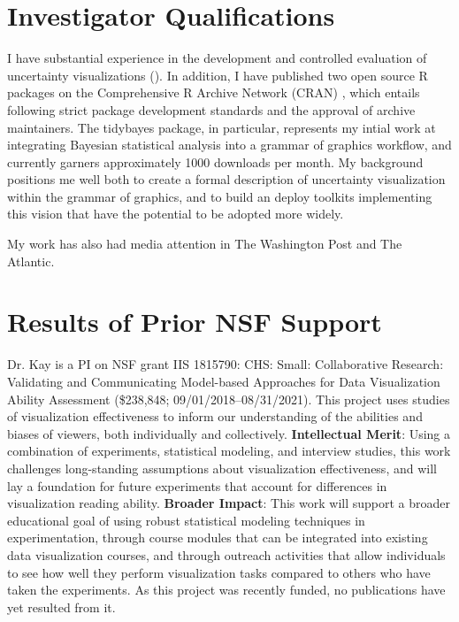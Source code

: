 \documentclass[11pt]{article}
\begin{document}
\section{Investigator Qualifications}
\noindent I have substantial experience in the development and controlled evaluation of uncertainty visualizations (\eg \cite{Fernandes2018, kay2016bus, kale2018hypothetical, hullman2018pursuit, hullman2018imagining, greis2017uncertaintyhci}). In addition, I have published two open source R packages \cite{kay2016artool, kay2017tidybayes} on the Comprehensive R Archive Network (CRAN) \cite{hornik2012cran}, which entails following strict package development standards \cite{hornik2012cran, cran1999writing} and the approval of archive maintainers. The tidybayes \cite{kay2017tidybayes} package, in particular, represents my intial work at integrating Bayesian statistical analysis into a grammar of graphics workflow, and currently garners approximately 1000 downloads per month. My background positions me well both to create a formal description of uncertainty visualization within the grammar of graphics, and to build an deploy toolkits implementing this vision that have the potential to be adopted more widely.

My work has also had media attention in The Washington Post and The Atlantic.

\section{Results of Prior NSF Support}
\noindent Dr. Kay is a PI on NSF grant IIS 1815790: CHS: Small: Collaborative Research: Validating and Communicating Model-based 
Approaches for Data Visualization Ability Assessment (\$238,848; 09/01/2018--08/31/2021).  This project uses studies of visualization effectiveness to inform our understanding of the abilities and biases of viewers, both individually and collectively. \textbf{Intellectual Merit}: Using a combination of experiments, statistical modeling, and interview studies, this work challenges long-standing assumptions about visualization effectiveness, and will lay a foundation for future experiments that account for differences in visualization reading ability. \textbf{Broader Impact}: This work will support a broader educational goal of using robust statistical modeling techniques in experimentation, through course modules that can be integrated into existing data visualization courses, and through outreach activities that allow individuals to see how well they perform visualization tasks compared to others who have taken the experiments. As this project was recently funded, no publications have yet resulted from it.
\end{document}
